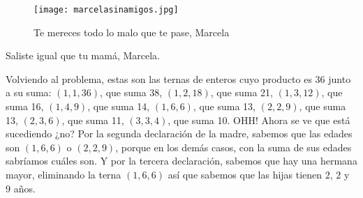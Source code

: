 \begin{figure}[h]
    \centering
    \texttt{[image: marcelasinamigos.jpg]} 
    \caption{Te mereces todo lo malo que te pase, Marcela}
\end{figure}

Saliste igual que tu mamá, Marcela.

Volviendo al problema, 
estas son las ternas de enteros cuyo producto es 36 junto a su suma: 
$(1, 1, 36)$, que suma 38, $(1, 2, 18)$, que suma 21, 
$(1, 3, 12)$, que suma 16, $(1, 4, 9)$, que suma 14,
$(1, 6, 6)$, que suma 13, $(2, 2, 9)$, que suma 13,
$(2, 3, 6)$, que suma 11, $(3, 3, 4)$, que suma 10.
OHH! Ahora se ve que está sucediendo ¿no? 
Por la segunda declaración de la madre, sabemos que las edades son 
$(1, 6, 6)$ o $(2, 2, 9)$, porque en los demás casos, 
con la suma de sus edades sabríamos cuáles son. 
Y por la tercera declaración, sabemos que hay una hermana mayor, eliminando la terna $(1, 6, 6)$ así que sabemos que 
las hijas tienen $2$, $2$ y $9$ años.
